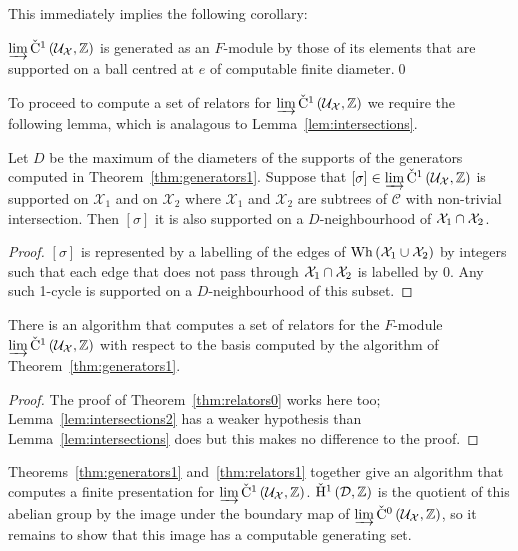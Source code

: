 This immediately implies the following corollary:

\begin{cor} $\varinjlim \check{\mathrm{C}}{}^1\left(\mathcal{U}_\mathcal{X}, \mathbb{Z}
\right)$ is generated as an $F$-module by those of its elements that are
supported on a ball centred at $e$ of computable finite diameter.\qed
\end{cor}

To proceed to compute a set of relators for $\varinjlim \check{\mathrm{C}}{}^1\left(
\mathcal{U}_\mathcal{X}, \mathbb{Z}\right)$ we require the following lemma,
which is analagous to Lemma~\ref{lem:intersections}.

\begin{lem}\label{lem:intersections2} Let $D$ be the maximum of the diameters
of the supports of the generators computed in Theorem~\ref{thm:generators1}.
Suppose that $\left[\sigma\right] \in \varinjlim \check{\mathrm{C}}{}^1\left(
\mathcal{U}_\mathcal{X}, \mathbb{Z}\right)$ is supported on $\mathcal{X}_1$
and on $\mathcal{X}_2$ where $\mathcal{X}_1$ and $\mathcal{X}_2$ are
subtrees of $\mathcal{C}$ with non-trivial intersection. Then
$\left[\sigma\right]$ it is also supported on a $D$-neighbourhood of
$\mathcal{X}_1 \cap \mathcal{X}_2$.\end{lem}

\begin{proof} $\left[\sigma\right]$ is represented by a labelling of the
edges of $\mathrm{Wh}\left(\mathcal{X}_1 \cup \mathcal{X}_2\right)$ by integers such that each
edge that does not pass through $\mathcal{X}_1 \cap \mathcal{X}_2$
is labelled by 0. Any such 1-cycle is supported on a $D$-neighbourhood of
this subset.\end{proof}

\begin{thm}\label{thm:relators1} There is an algorithm that computes a set of
relators for the $F$-module $\varinjlim \check{\mathrm{C}}{}^1\left(
\mathcal{U}_\mathcal{X}, \mathbb{Z}\right)$ with respect to the basis computed
by the algorithm of Theorem~\ref{thm:generators1}.\end{thm}

\begin{proof} The proof of Theorem~\ref{thm:relators0} works here too;
Lemma~\ref{lem:intersections2} has a weaker hypothesis than
Lemma~\ref{lem:intersections} does but this makes no difference to the proof.
\end{proof}

Theorems~\ref{thm:generators1} and~\ref{thm:relators1} together give an
algorithm that computes a finite presentation for $\varinjlim\check{\mathrm{C}}{}^1
\left(\mathcal{U}_\mathcal{X}, \mathbb{Z}\right)$.  $\check{\mathrm{H}}{}^1\left(
\mathcal{D}, \mathbb{Z}\right)$ is the quotient of this abelian group by the
image under the boundary map of $\varinjlim\check{\mathrm{C}}{}^0\left(
\mathcal{U}_\mathcal{X}, \mathbb{Z}\right)$, so it remains to show that this
image has a computable generating set.

